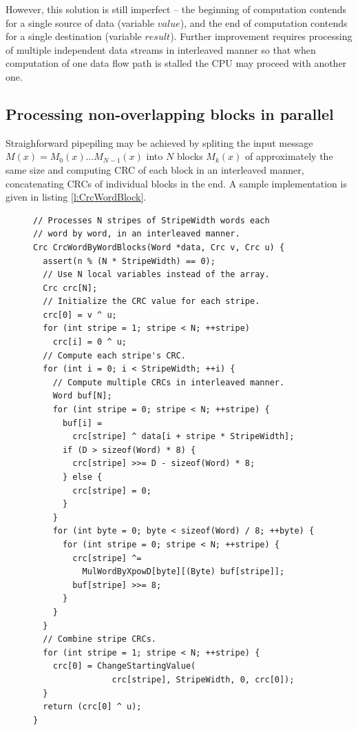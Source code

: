 \documentclass{article}
\begin{document}
However, this solution is still imperfect -- the beginning of computation
contends for a single source of data (variable $value$), and the end of
computation contends for a single destination (variable $result$). Further
improvement requires processing of multiple independent data streams in
interleaved manner so that when computation of one data flow path is
stalled the CPU may proceed with another one.

\subsection{Processing non-overlapping blocks in parallel} \label{s:blockword}

Straighforward pipepiling may be achieved by spliting the input message
$M(x)=M_0(x) \ldots M_{N-1}(x)$ into $N$ blocks $M_k(x)$ of approximately
the same size and computing CRC of each block in an interleaved manner,
concatenating CRCs of individual blocks in the end. A sample implementation
is given in listing \ref{l:CrcWordBlock}.

\begin{figure}
\begin{lstlisting}[caption={Processing non-overlapping blocks in parallel},label={l:CrcWordBlock}]
// Processes N stripes of StripeWidth words each
// word by word, in an interleaved manner.
Crc CrcWordByWordBlocks(Word *data, Crc v, Crc u) {
  assert(n % (N * StripeWidth) == 0);
  // Use N local variables instead of the array.
  Crc crc[N];
  // Initialize the CRC value for each stripe.
  crc[0] = v ^ u;
  for (int stripe = 1; stripe < N; ++stripe)
    crc[i] = 0 ^ u;
  // Compute each stripe's CRC.
  for (int i = 0; i < StripeWidth; ++i) {
    // Compute multiple CRCs in interleaved manner.
    Word buf[N];
    for (int stripe = 0; stripe < N; ++stripe) {
      buf[i] =
        crc[stripe] ^ data[i + stripe * StripeWidth];
      if (D > sizeof(Word) * 8) {
        crc[stripe] >>= D - sizeof(Word) * 8;
      } else {
        crc[stripe] = 0;
      }
    }
    for (int byte = 0; byte < sizeof(Word) / 8; ++byte) {
      for (int stripe = 0; stripe < N; ++stripe) {
        crc[stripe] ^=
          MulWordByXpowD[byte][(Byte) buf[stripe]];
        buf[stripe] >>= 8;
      }
    }
  }
  // Combine stripe CRCs.
  for (int stripe = 1; stripe < N; ++stripe) {
    crc[0] = ChangeStartingValue(
                crc[stripe], StripeWidth, 0, crc[0]);
  }
  return (crc[0] ^ u);
}
\end{lstlisting}
\end{figure}
\end{document}
